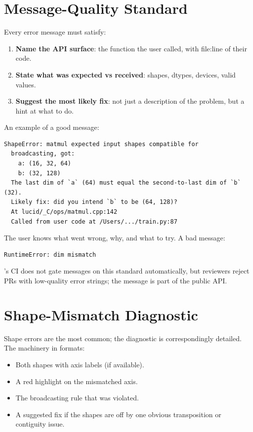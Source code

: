 \section{Message-Quality Standard}
\label{sec:error_handling:message_standard}

Every error message must satisfy:

\begin{enumerate}
  \item \textbf{Name the API surface}: the function the user
    called, with file:line of their code.
  \item \textbf{State what was expected vs received}: shapes,
    dtypes, devices, valid values.
  \item \textbf{Suggest the most likely fix}: not just a
    description of the problem, but a hint at what to do.
\end{enumerate}

An example of a good message:

\begin{lstlisting}[style=lucid,language=LucidPython]
ShapeError: matmul expected input shapes compatible for
  broadcasting, got:
    a: (16, 32, 64)
    b: (32, 128)
  The last dim of `a` (64) must equal the second-to-last dim of `b` (32).
  Likely fix: did you intend `b` to be (64, 128)?
  At lucid/_C/ops/matmul.cpp:142
  Called from user code at /Users/.../train.py:87
\end{lstlisting}

The user knows what went wrong, why, and what to try.
A bad message:

\begin{lstlisting}[style=lucid,language=LucidPython]
RuntimeError: dim mismatch
\end{lstlisting}

\Lucid's CI does not gate messages on this standard
automatically, but reviewers reject PRs with low-quality
error strings; the message is part of the public API.

\section{Shape-Mismatch Diagnostic}
\label{sec:error_handling:shape_diagnostic}

Shape errors are the most common; the diagnostic is correspondingly
detailed. The  machinery in
 formats:

\begin{itemize}
  \item Both shapes with axis labels (if available).
  \item A red highlight on the mismatched axis.
  \item The broadcasting rule that was violated.
  \item A suggested fix if the shapes are off by one obvious
    transposition or contiguity issue.
\end{itemize}

